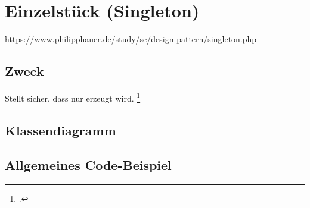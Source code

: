 \documentclass{lehramt-informatik-haupt}
\begin{document}

\chapter{Einzelstück (Singleton)}

\begin{quellen}
\item \cite{wiki:singleton}
\item \url{https://www.philipphauer.de/study/se/design-pattern/singleton.php}
\item \cite[Seite 109-115]{gof}
\item \cite[Kapitel 8.3.1, Seite 247-249]{schatten}
\item \cite[Kapitel 3.4 Seite 38-43]{eilebrecht}
\item \cite[Kapitel 1, Seite 1-17]{siebler}
\end{quellen}

\section{Zweck}

Stellt sicher, dass nur  erzeugt
wird.
\footcite[Seite 38]{eilebrecht}

%

\section{Klassendiagramm}


%

\section{Allgemeines Code-Beispiel}


\literatur
\end{document}
